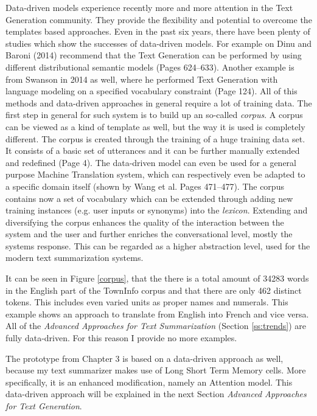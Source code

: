 Data-driven models experience recently more and more attention in the Text Generation community. They provide the flexibility and potential to overcome the templates based approaches. Even in the past six years, there have been plenty of studies which show the successes of data-driven models. For example on Dinu and Baroni (2014) recommend that the Text Generation can be performed by using different distributional semantic models \cite{dinu-baroni-2014-make} (Pages 624–633). Another example is from Swanson in 2014 as well, where he performed Text Generation with language modeling on a specified vocabulary constraint \cite{swanson-etal-2014-natural} (Page 124). All of this methods and data-driven approaches in general require a lot of training data. The first step in general for such system is to build up an so-called \textit{corpus}. A corpus can be viewed as a kind of template as well, but the way it is used is completely different. The corpus is created through the training of a huge training data set. It consists of a basic set of utterances and it can be further manually extended and redefined \cite{elena} (Page 4). The data-driven model can even be used for a general purpose Machine Translation system, which can respectively even be adapted to a specific domain itself (shown by Wang et al. \cite{wang-hirst-2009-extracting} Pages 471–477). The corpus contains now a set of vocabulary which can be extended through adding new training instances (e.g. user inputs or synonyms) into the \textit{lexicon}. 
Extending and diversifying the corpus enhances the quality of the interaction between
the system and the user and further enriches the conversational level, mostly the systems response. This can be regarded as a higher abstraction level, used for the modern text summarization systems. 

It can be seen in Figure \ref{corpus}, that the there is a total amount of 34283 words in the English part of the TownInfo corpus and that there are only 462 distinct tokens. This includes even varied units as proper names and numerals. This example shows an approach to translate from English into French and vice versa. All of the \textit{Advanced Approaches for Text Summarization} (Section \ref{ss:trends}) are fully data-driven. For this reason I provide no more examples.

The prototype from Chapter 3 is based on a data-driven approach as well, because my text summarizer makes use of Long Short Term Memory cells. More specifically, it is an enhanced modification, namely an Attention model. This data-driven approach will be explained in the next Section \textit{Advanced Approaches for Text Generation}.

